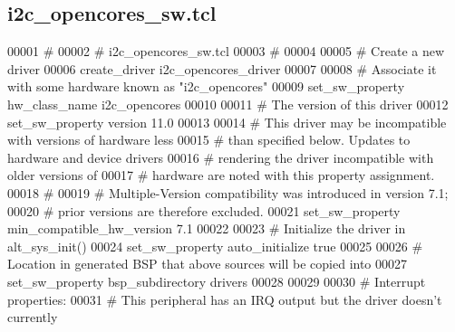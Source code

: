 \subsection{i2c\+\_\+opencores\+\_\+sw.\+tcl}
\label{i2c__opencores__sw_8tcl_source}

\begin{DoxyCode}
00001 \textcolor{comment}{#}
00002 \textcolor{comment}{}\textcolor{comment}{# i2c\_opencores\_sw.tcl}
00003 \textcolor{comment}{}\textcolor{comment}{#}
00004 \textcolor{comment}{}
00005 \textcolor{comment}{# Create a new driver}
00006 \textcolor{comment}{}create\_driver i2c\_opencores\_driver\textcolor{comment}{}
00007 \textcolor{comment}{}
00008 \textcolor{comment}{# Associate it with some hardware known as "i2c\_opencores"}
00009 \textcolor{comment}{}set\_sw\_property hw\_class\_name i2c\_opencores\textcolor{comment}{}
00010 \textcolor{comment}{}
00011 \textcolor{comment}{# The version of this driver}
00012 \textcolor{comment}{}set\_sw\_property version 11.0\textcolor{comment}{}
00013 \textcolor{comment}{}
00014 \textcolor{comment}{# This driver may be incompatible with versions of hardware less}
00015 \textcolor{comment}{}\textcolor{comment}{# than specified below. Updates to hardware and device drivers}
00016 \textcolor{comment}{}\textcolor{comment}{# rendering the driver incompatible with older versions of}
00017 \textcolor{comment}{}\textcolor{comment}{# hardware are noted with this property assignment.}
00018 \textcolor{comment}{}\textcolor{comment}{#}
00019 \textcolor{comment}{}\textcolor{comment}{# Multiple-Version compatibility was introduced in version 7.1;}
00020 \textcolor{comment}{}\textcolor{comment}{# prior versions are therefore excluded.}
00021 \textcolor{comment}{}set\_sw\_property min\_compatible\_hw\_version 7.1\textcolor{comment}{}
00022 \textcolor{comment}{}
00023 \textcolor{comment}{# Initialize the driver in alt\_sys\_init()}
00024 \textcolor{comment}{}set\_sw\_property auto\_initialize true\textcolor{comment}{}
00025 \textcolor{comment}{}
00026 \textcolor{comment}{# Location in generated BSP that above sources will be copied into}
00027 \textcolor{comment}{}set\_sw\_property bsp\_subdirectory drivers\textcolor{comment}{}
00028 \textcolor{comment}{}
00029 
00030 \textcolor{comment}{# Interrupt properties:}
00031 \textcolor{comment}{}\textcolor{comment}{# This peripheral has an IRQ output but the driver doesn't currently}

\end{DoxyCode}

